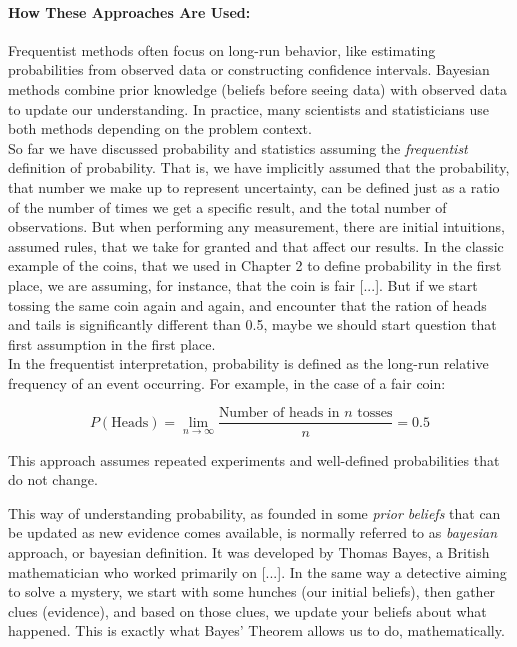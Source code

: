 \documentclass{book}
\begin{document}
\paragraph{How These Approaches Are Used:}
Frequentist methods often focus on long-run behavior, like estimating probabilities from observed data or constructing confidence intervals. Bayesian methods combine prior knowledge (beliefs before seeing data) with observed data to update our understanding. In practice, many scientists and statisticians use both methods depending on the problem context.\\

So far we have discussed probability and statistics assuming the \textit{frequentist} definition of probability. That is, we have implicitly assumed that the probability, that number we make up to represent uncertainty, can be defined just as a ratio of the number of times we get a specific result, and the total number of observations. But when performing any measurement, there are initial intuitions, assumed rules, that we take for granted and that affect our results. In the classic example of the coins, that we used in Chapter 2 to define probability in the first place, we are assuming, for instance, that the coin is fair [...]. But if we start tossing the same coin again and again, and encounter that the ration of heads and tails is significantly different than 0.5, maybe we should start question that first assumption in the first place.\\

In the frequentist interpretation, probability is defined as the long-run relative frequency of an event occurring. For example, in the case of a fair coin:

\[
P(\text{Heads}) = \lim_{n \to \infty} \frac{\text{Number of heads in } n \text{ tosses}}{n} = 0.5
\]

This approach assumes repeated experiments and well-defined probabilities that do not change.

This way of understanding probability, as founded in some \textit{prior beliefs} that can be updated as new evidence comes available, is normally referred to as \textit{bayesian} approach, or bayesian definition. It was developed by Thomas Bayes, a British mathematician who worked primarily on [...]. In the same way a detective aiming to solve a mystery, we start with some hunches (our initial beliefs), then gather clues (evidence), and based on those clues, we update your beliefs about what happened. This is exactly what Bayes' Theorem allows us to do, mathematically.\\
\end{document}
